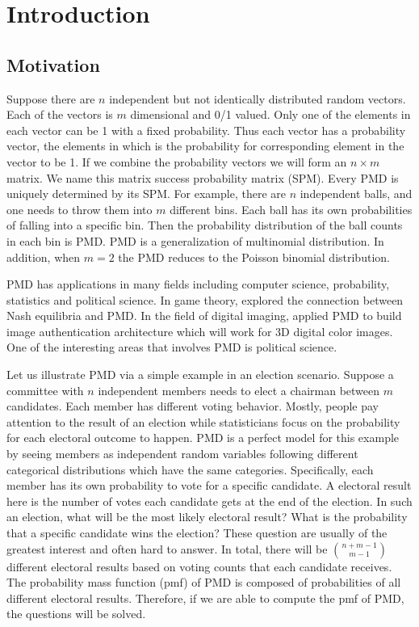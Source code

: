 \documentclass[12pt]{article}
\newcommand{\PMD}{\textrm{PMD}}
\begin{document}
\section{Introduction}
\subsection{Motivation}

Suppose there are $n$ independent but not identically distributed random vectors. Each of the vectors is $m$ dimensional and 0/1 valued. Only one of the elements in each vector can be 1 with a fixed probability. Thus each vector has a probability vector, the elements in which is the probability for corresponding element in the vector to be 1. If we combine the probability vectors we will form an $n \times m$ matrix. We name this matrix success probability matrix (SPM). Every $\PMD$ is uniquely determined by its SPM. For example, there are $n$ independent balls, and one needs to throw them into $m$ different bins. Each ball has its own probabilities of falling into a specific bin. Then the probability distribution of the ball counts in each bin is $\PMD$. $\PMD$ is a generalization of multinomial distribution. In addition, when $m=2$ the $\PMD$ reduces to the Poisson binomial distribution.

$\PMD$ has applications in many fields including computer science, probability, statistics and political science.  In game theory,  explored the connection between Nash equilibria and $\PMD$. In the field of digital imaging,  applied $\PMD$ to build image authentication architecture which will work for 3D digital color images. One of the interesting areas that involves $\PMD$ is political science.

Let us illustrate $\PMD$ via a simple example in an election scenario. Suppose a committee with $n$  independent members needs to elect a chairman between $m$ candidates. Each member has different voting behavior. Mostly, people pay attention to the result of an election while statisticians focus on the probability for each electoral outcome to happen. $\PMD$ is a perfect model for this example by seeing members as independent random variables following different categorical distributions which have the same categories. Specifically, each member has its own probability to vote for a specific candidate. A electoral result here is the number of votes each candidate gets at the end of the election. In such an election, what will be the most likely electoral result? What is the probability that a specific candidate wins the election? These question are usually of the greatest interest and often hard to answer. In total, there will be $\binom{n+m-1}{m-1}$ different electoral results based on voting counts that each candidate receives. The probability mass function (pmf) of $\PMD$ is composed of probabilities of all different electoral results. Therefore, if we are able to compute the pmf of $\PMD$, the questions will be solved.
\end{document}
